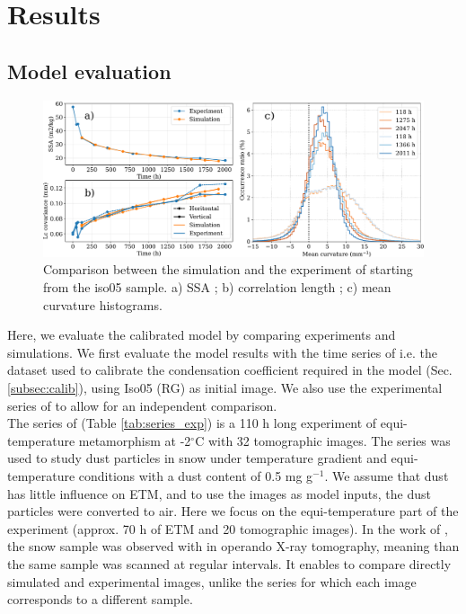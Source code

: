 \documentclass[draft,ms]{agujournal2019}
\begin{document}
\section{Results}
\label{sec:results}
\subsection{Model evaluation}
\label{Section:Calibration}

\begin{figure}
    \centering
    \includegraphics[width=\linewidth]{Figures/flin_evaluation_courbes_lc_ssa_histo.pdf}
    \caption{Comparison between the simulation and the experiment of \protect{} starting from the iso05 sample. a) SSA ; b) correlation length ; c) mean curvature histograms.}
    \label{fig:flin_evaluation}
\end{figure}

Here, we evaluate the calibrated model by comparing experiments and simulations. We first evaluate the model results with the time series of  i.e. the dataset used to calibrate the condensation coefficient required in the model (Sec. \ref{subsec:calib}), using  Iso05 (RG) as initial image. We also use the experimental series of  to allow for an independent comparison.\\

The series of  (Table \ref{tab:series_exp}) is a 110 h long experiment of equi-temperature metamorphism at -2$^\circ$C with 32 tomographic images. The series was used to study dust particles in snow under temperature gradient and equi-temperature conditions with a dust content of 0.5 mg g$^{-1}$. We assume that dust has little influence on ETM, and to use the images as model inputs, the dust particles were converted to air. Here we focus on the equi-temperature part of the experiment (approx. 70 h of ETM and 20 tomographic images). In the work of , the snow sample was observed with in operando X-ray tomography, meaning than the same sample was scanned at regular intervals. It enables to compare directly simulated and experimental images, unlike the  series for which each image corresponds to a different sample.\\
\end{document}
